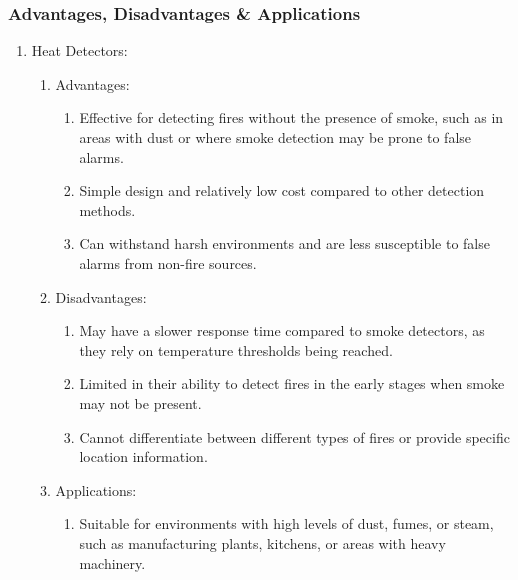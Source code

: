 \documentclass{article}
\begin{document}
\subsubsection*{Advantages, Disadvantages \& Applications}
\begin{enumerate}
  \item Heat Detectors:
  \begin{enumerate}
    \item   Advantages:
    \begin{enumerate}
      \item Effective for detecting fires without the presence of smoke, such as in areas with dust or where smoke detection may be prone to false alarms.
      \item Simple design and relatively low cost compared to other detection methods.
      \item Can withstand harsh environments and are less susceptible to false alarms from non-fire sources.
    \end{enumerate}

    \item Disadvantages:
    \begin{enumerate}
      \item May have a slower response time compared to smoke detectors, as they rely on temperature thresholds being reached.
      \item Limited in their ability to detect fires in the early stages when smoke may not be present.
      \item Cannot differentiate between different types of fires or provide specific location information.
    \end{enumerate}

    \item   Applications:
    \begin{enumerate}
      \item Suitable for environments with high levels of dust, fumes, or steam, such as manufacturing plants, kitchens, or areas with heavy machinery.
    \end{enumerate}
    

\end{enumerate}
\end{enumerate}
\end{document}
